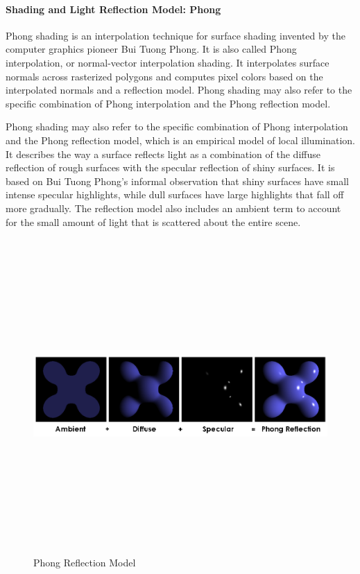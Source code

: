 \documentclass{report}
\begin{document}
    \paragraph{Shading and Light Reflection Model: Phong}
    Phong shading is an interpolation technique for surface shading invented by the computer graphics 
    pioneer Bui Tuong Phong. It is also called Phong interpolation, or normal-vector interpolation 
    shading. It interpolates surface normals across rasterized polygons and computes pixel colors 
    based on the interpolated normals and a reflection model. Phong shading may also refer to the 
    specific combination of Phong interpolation and the Phong reflection model.\cite{DUMMY:2} 

        Phong shading may also refer to the specific combination of Phong interpolation and the Phong 
    reflection model, which is an empirical model of local illumination. It describes the way a surface 
    reflects light as a combination of the diffuse reflection of rough surfaces with the specular 
    reflection of shiny surfaces. It is based on Bui Tuong Phong's informal observation that shiny 
    surfaces have small intense specular highlights, while dull surfaces have large highlights that 
    fall off more gradually. The reflection model also includes an ambient term to account for the 
    small amount of light that is scattered about the entire scene. 

    \medskip
    \begin{figure}[h!]
      \centering
        \includegraphics[width=12cm,height=12cm,keepaspectratio]{Phong4.png}
        \caption{Phong Reflection Model}
    \end{figure}
\end{document}

